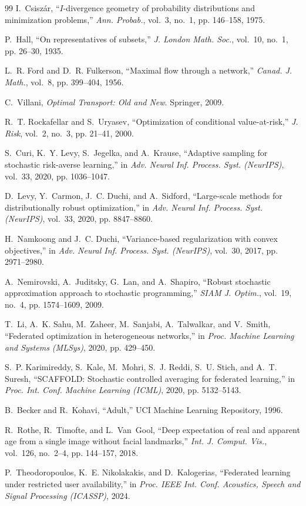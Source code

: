 \documentclass{article}
\theoremstyle{definition}
\begin{document}
\begin{thebibliography}{99}
I.~Csisz\'{a}r, ``$I$-divergence geometry of probability distributions and
minimization problems,'' \emph{Ann. Probab.}, vol.~3, no.~1, pp. 146--158, 1975.

P.~Hall, ``On representatives of subsets,'' \emph{J. London Math. Soc.},
vol.~10, no.~1, pp. 26--30, 1935.

L.~R. Ford and D.~R. Fulkerson, ``Maximal flow through a network,'' \emph{Canad.
J. Math.}, vol.~8, pp. 399--404, 1956.

C.~Villani, \emph{Optimal Transport: Old and New}. Springer, 2009.

R.~T. Rockafellar and S.~Uryasev, ``Optimization of conditional value-at-risk,''
\emph{J. Risk}, vol.~2, no.~3, pp. 21--41, 2000.

S.~Curi, K.~Y. Levy, S.~Jegelka, and A.~Krause, ``Adaptive sampling for
stochastic risk-averse learning,'' in \emph{Adv. Neural Inf. Process. Syst.
(NeurIPS)}, vol.~33, 2020, pp. 1036--1047.

D.~Levy, Y.~Carmon, J.~C. Duchi, and A.~Sidford, ``Large-scale methods for
distributionally robust optimization,'' in \emph{Adv. Neural Inf. Process.
Syst. (NeurIPS)}, vol.~33, 2020, pp. 8847--8860.

H.~Namkoong and J.~C. Duchi, ``Variance-based regularization with convex
objectives,'' in \emph{Adv. Neural Inf. Process. Syst. (NeurIPS)}, vol.~30,
2017, pp. 2971--2980.

A.~Nemirovski, A.~Juditsky, G.~Lan, and A.~Shapiro, ``Robust stochastic
approximation approach to stochastic programming,'' \emph{SIAM J. Optim.},
vol.~19, no.~4, pp. 1574--1609, 2009.

T.~Li, A.~K. Sahu, M.~Zaheer, M.~Sanjabi, A.~Talwalkar, and V.~Smith,
``Federated optimization in heterogeneous networks,'' in \emph{Proc. Machine
Learning and Systems (MLSys)}, 2020, pp. 429--450.

S.~P. Karimireddy, S.~Kale, M.~Mohri, S.~J. Reddi, S.~U. Stich, and A.~T.
Suresh, ``SCAFFOLD: Stochastic controlled averaging for federated learning,''
in \emph{Proc. Int. Conf. Machine Learning (ICML)}, 2020, pp. 5132--5143.

B.~Becker and R.~Kohavi, ``Adult,'' UCI Machine Learning Repository, 1996.

R.~Rothe, R.~Timofte, and L.~Van~Gool, ``Deep expectation of real and apparent
age from a single image without facial landmarks,'' \emph{Int. J. Comput.
Vis.}, vol.~126, no.~2--4, pp. 144--157, 2018.

P.~Theodoropoulos, K.~E. Nikolakakis, and D.~Kalogerias, ``Federated learning
under restricted user availability,'' in \emph{Proc. IEEE Int. Conf. Acoustics,
Speech and Signal Processing (ICASSP)}, 2024.

\end{thebibliography}
\end{document}
